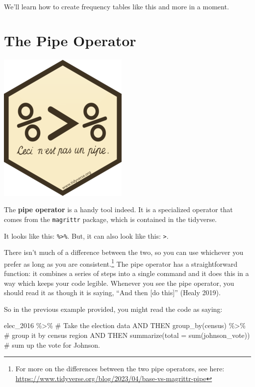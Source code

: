 \documentclass[
  letterpaper,
]{book}
\newenvironment{Shaded}{\begin{snugshade}}{\end{snugshade}}
\newcommand{\AttributeTok}[1]{\textcolor[rgb]{0.40,0.45,0.13}{#1}}
\newcommand{\CommentTok}[1]{\textcolor[rgb]{0.37,0.37,0.37}{#1}}
\newcommand{\FunctionTok}[1]{\textcolor[rgb]{0.28,0.35,0.67}{#1}}
\newcommand{\NormalTok}[1]{\textcolor[rgb]{0.00,0.23,0.31}{#1}}
\newcommand{\SpecialCharTok}[1]{\textcolor[rgb]{0.37,0.37,0.37}{#1}}
\begin{document}
We'll learn how to create frequency tables like this and more in a
moment.

\hypertarget{the-pipe-operator}{%
\section{The Pipe Operator}\label{the-pipe-operator}}

\includegraphics{images/ceci_pipe.png}

The \textbf{pipe operator} is a handy tool indeed. It is a specialized
operator that comes from the \texttt{magrittr} package, which is
contained in the tidyverse.

It looks like this: \texttt{\%\textgreater{}\%}. But, it can also look
like this: \texttt{\textbar{}\textgreater{}}.

There isn't much of a difference between the two, so you can use
whichever you prefer as long as you are consistent.\footnote{For more on
  the differences between the two pipe operators, see here:
  \href{https://www.tidyverse.org/blog/2023/04/base-vs-magrittr-pipe/\#}{https://www.tidyverse.org/blog/2023/04/base-vs-magrittr-pipe}}
The pipe operator has a straightforward function: it combines a series
of steps into a single command and it does this in a way which keeps
your code legible. Whenever you see the pipe operator, you should read
it as though it is saying, ``And then {[}do this{]}'' (Healy 2019).

So in the previous example provided, you might read the code as saying:

\begin{Shaded}
\begin{Highlighting}[]
\NormalTok{elec\_2016 }\SpecialCharTok{\%\textgreater{}\%}                            \CommentTok{\# Take the election data AND THEN}
  \FunctionTok{group\_by}\NormalTok{(census) }\SpecialCharTok{\%\textgreater{}\%}                   \CommentTok{\# group it by census region AND THEN}
  \FunctionTok{summarize}\NormalTok{(}\AttributeTok{total =} \FunctionTok{sum}\NormalTok{(johnson\_vote))   }\CommentTok{\# sum up the vote for Johnson.}
\end{Highlighting}
\end{Shaded}
\end{document}
